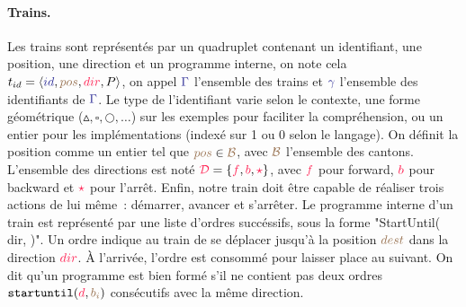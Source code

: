 \documentclass[oneside, a4paper, 11pt]{book}
\newcommand{\todoMV}[2][]{\todo[color=green, #1]{#2}}
\newcommand{\trainFmt}[1]{{\color{traincolor} #1}}
\newcommand{\trainTuple}[4]{\langle \trainFmt{#1}, \posFmt{#2}, \dirFmt{#3}, #4 \rangle}
\newcommand{\forward}{\ensuremath{\mathtt{f}}\xspace}
\newcommand{\backward}{\ensuremath{\mathtt{b}}\xspace}
\newcommand{\directions}{\dirFmt{\mathcal{D}}}
\newcommand{\dirFmt}[1]{{\color{dircolor} #1}}
\newcommand{\dirForward}{\ensuremath{\dirFmt{\forward}}\xspace}
\newcommand{\dirBackward}{\ensuremath{\dirFmt{\backward}}\xspace}
\newcommand{\dirStop}{\ensuremath{\dirFmt{\star}}\xspace}
\newcommand{\posFmt}[1]{{\color{poscolor}{#1}}}
\newcommand{\bid}[1]{\ensuremath{\posFmt{b_{#1}}}}
\newcommand{\su}[2]{{\mbox{$\mathtt{startuntil}(\dirFmt{#1}, \posFmt{#2})$}}}
\begin{document}
\paragraph{Trains.} 
Les trains sont représentés par un quadruplet contenant un identifiant, une position, une direction et un programme interne, on note cela $t_{id} = \trainTuple{id}{pos}{dir}{P}$, on appel $\trainFmt{\Gamma}$ l'ensemble des trains et $\trainFmt{\gamma}$ l'ensemble des identifiants de $\trainFmt{\Gamma}$.
Le type de l'identifiant varie selon le contexte, une forme géométrique ($\vartriangle,\square,\bigcirc,\dots$) sur les exemples pour faciliter la compréhension, ou un entier pour les implémentations (indexé sur 1 ou 0 selon le langage).
On définit la position comme un entier tel que $\posFmt{pos} \in \posFmt{\mathcal{B}}$, avec $\posFmt{\mathcal{B}}$ l'ensemble des cantons. 
L'ensemble des directions est noté $\directions = \{ \dirFmt{f}, \dirFmt{b}, \dirFmt{\star} \}$, avec $\dirFmt{f}$ pour forward, $\dirFmt{b}$ pour backward et $\dirFmt{\star}$ pour l'arrêt.
Enfin, notre train doit être capable de réaliser trois actions de lui \todoMV{ortho}même~: démarrer, avancer et s'arrêter.
Le programme interne d'un train est représenté par une liste d'ordres succéssifs\todoMV{ortho}, sous la forme "StartUntil(\dirFmt{dir}, \posFmt{dest})"\todoMV{format}.
Un ordre indique au train de se déplacer jusqu'à la position $\posFmt{dest}$ dans la direction $\dirFmt{dir}$. À l'arrivée, l'ordre est consommé pour laisser place au suivant.
On dit qu'un programme est bien formé s'il ne contient pas deux ordres \su{d}{\bid{i}} consécutifs avec la même direction.
\end{document}
